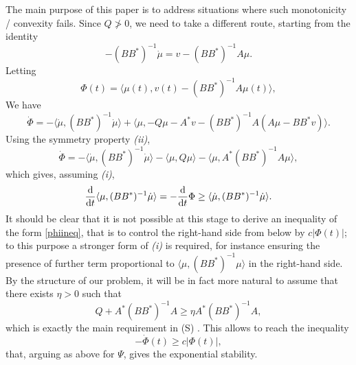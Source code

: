 \documentclass[10pt,a4paper,nouppercase,nowrite]{article}
\numberwithin{equation}{section}
\newcommand{\di}{{\rm d}}
\newcommand{\Sp}{{\textsc (S)} }
\theoremstyle{definition}
\begin{document}
	The main purpose of this paper is to address situations where such monotonicity / convexity fails. Since $Q \not> 0$, we need to take a different route, starting from the identity
	\[
	-(BB^*)^{-1}\dot{\mu} = v - (BB^*)^{-1}A \mu.
	\]
	Letting
	\[
	\Phi(t) = \langle\mu(t), v(t) - (BB^*)^{-1}A \mu(t) \rangle,
	\]
	We have
	\[
	\dot{ \Phi} = -\langle\dot{\mu},(BB^*)^{-1}\dot{\mu} \rangle + \langle\mu, -Q\mu - A^* v - (BB^*)^{-1}A (A\mu - BB^*v)\rangle.
	\]
	Using the symmetry property \textit{(ii)},
	\begin{equation}\label{phidot}
	\dot{ \Phi} = -\langle\dot{\mu},(BB^*)^{-1}\dot{\mu} \rangle - \langle\mu, Q\mu\rangle  -\langle \mu, A^* (BB^*)^{-1}A \mu \rangle,
	\end{equation}
	which gives, assuming \textit{(i)},
	\[
	\frac{\di}{\di t} \langle\mu, (BB^*)^{-1}\dot{\mu} \rangle = -\frac{\di}{\di t}   \Phi \ge \langle\dot{\mu},(BB^*)^{-1}\dot{\mu} \rangle.
	\]
	It should be clear that it is not possible at this stage to derive an inequality of the form \eqref{phiineq}, that is to control the right-hand side from below by $c|\Phi(t)|$; to this purpose a stronger form of \textit{(i)} is required, for instance ensuring the presence of further term proportional to $\langle \mu,(BB^*)^{-1} \mu \rangle$ in the right-hand side. By the structure of our problem, it will be in fact more natural to assume that there exists $\eta > 0$ such that
	\[
	Q+A^{*}(BB^{*})^{-1} A  \geq \eta A^{*}(BB^{*})^{-1} A,
	\]
	which is exactly the main requirement in \Sp. This allows to reach the inequality
	\[
	- \dot{ \Phi} (t) \ge c|\Phi(t)|,
	\]
	that, arguing as above for $\Psi$, gives the exponential stability.
%	
\end{document}
